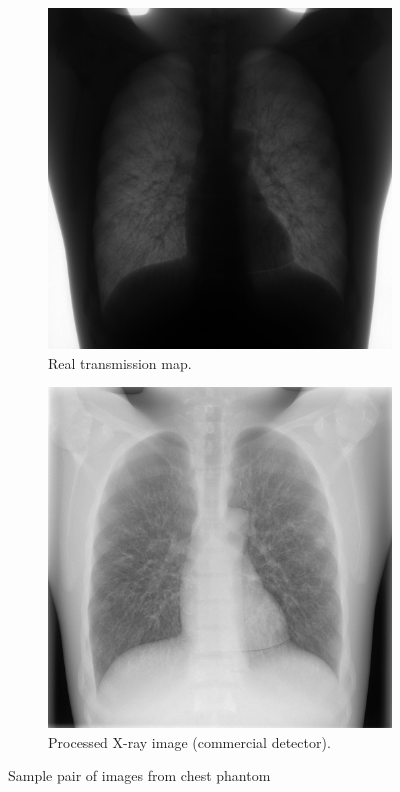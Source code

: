 \documentclass[nomenclature, english, bibtex]{kththesis}
\numberwithin{listing}{chapter}
\begin{document}
\begin{figure}[H]
    \centering
    \begin{subfigure}[t]{0.45\textwidth}
        \includegraphics[width=\textwidth]{figures/comm_unprocessed_sample.jpg}
        \caption{Real transmission map.}
    \end{subfigure}
    \begin{subfigure}[t]{0.45\textwidth}
        \includegraphics[width=\textwidth]{figures/comm_processed_sample.jpg}
        \caption{Processed X-ray image (commercial detector).}
    \end{subfigure}
    \caption{Sample pair of images from chest phantom}
    \label{fig:chestPhantomImages}
\end{figure}
\end{document}
